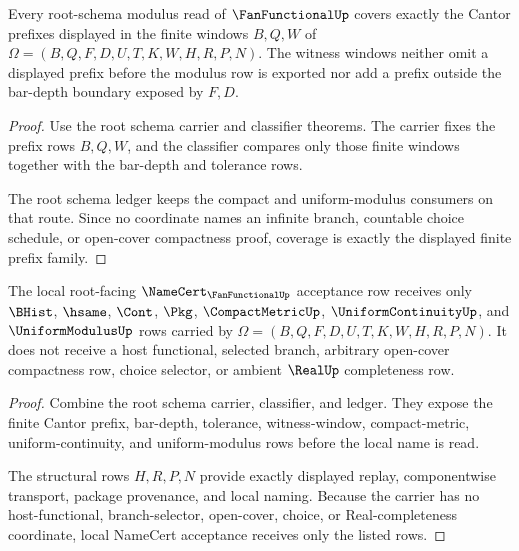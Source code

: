 \begin{theorem}
\label{thm:fanfunctional-root-modulus-window-coverage}
Every root-schema modulus read of $\FanFunctionalUp$ covers exactly the Cantor prefixes displayed in the finite windows $B,Q,W$ of $\Omega=(B,Q,F,D,U,T,K,W,H,R,P,N)$. The witness windows neither omit a displayed prefix before the modulus row is exported nor add a prefix outside the bar-depth boundary exposed by $F,D$.
\end{theorem}
\begin{proof}
Use the root schema carrier and classifier theorems. The carrier fixes the prefix rows $B,Q,W$, and the classifier compares only those finite windows together with the bar-depth and tolerance rows.

The root schema ledger keeps the compact and uniform-modulus consumers on that route. Since no coordinate names an infinite branch, countable choice schedule, or open-cover compactness proof, coverage is exactly the displayed finite prefix family.
\end{proof}

\begin{theorem}
\label{thm:fanfunctional-root-namecert-acceptance}
The local root-facing $\NameCert_{\FanFunctionalUp}$ acceptance row receives only $\BHist$, $\hsame$, $\Cont$, $\Pkg$, $\CompactMetricUp$, $\UniformContinuityUp$, and $\UniformModulusUp$ rows carried by $\Omega=(B,Q,F,D,U,T,K,W,H,R,P,N)$. It does not receive a host functional, selected branch, arbitrary open-cover compactness row, choice selector, or ambient $\RealUp$ completeness row.
\end{theorem}
\begin{proof}
Combine the root schema carrier, classifier, and ledger. They expose the finite Cantor prefix, bar-depth, tolerance, witness-window, compact-metric, uniform-continuity, and uniform-modulus rows before the local name is read.

The structural rows $H,R,P,N$ provide exactly displayed replay, componentwise transport, package provenance, and local naming. Because the carrier has no host-functional, branch-selector, open-cover, choice, or Real-completeness coordinate, local NameCert acceptance receives only the listed rows.
\end{proof}
